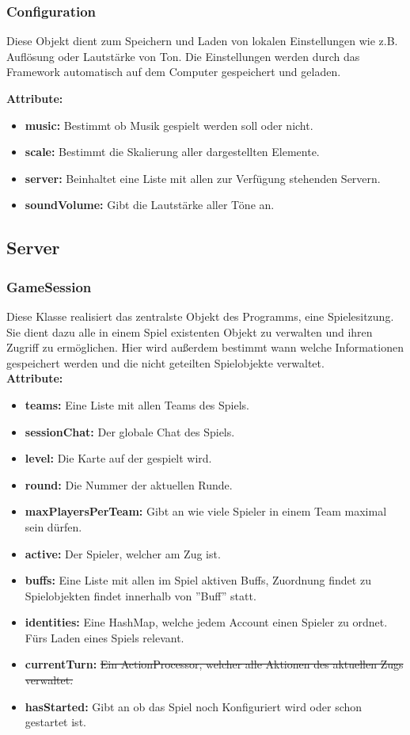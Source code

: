 \documentclass[fontsize=12pt,paper=a4,twoside]{scrartcl}
\begin{document}
\subsubsection{Configuration}
Diese Objekt dient zum Speichern und Laden von lokalen Einstellungen wie z.B. Auflösung oder Lautstärke von Ton. Die Einstellungen werden durch das Framework automatisch auf dem Computer gespeichert und geladen.

\textbf{Attribute:}
\begin{itemize}
	\item \textbf{music:} Bestimmt ob Musik gespielt werden soll oder nicht.
	\item \textbf{scale:} Bestimmt die Skalierung aller dargestellten Elemente.
	\item \textbf{server:} Beinhaltet eine Liste mit allen zur Verfügung stehenden Servern.
	\item \textbf{soundVolume:} Gibt die Lautstärke aller Töne an. 
\end{itemize}

\subsection{Server}

\subsubsection{GameSession}

Diese Klasse realisiert das zentralste Objekt des Programms, eine Spielesitzung. Sie dient dazu alle in einem Spiel existenten Objekt zu verwalten und ihren Zugriff zu ermöglichen. Hier wird außerdem bestimmt wann welche Informationen gespeichert werden und die nicht geteilten Spielobjekte verwaltet. \\

\textbf{Attribute:}
\begin{itemize}
\item \textbf{teams:} Eine Liste mit allen Teams des Spiels.
\item \textbf{sessionChat:} Der globale Chat des Spiels.
\item \textbf{level:} Die Karte auf der gespielt wird.
\item \textbf{round:} Die Nummer der aktuellen Runde.
\item \textbf{maxPlayersPerTeam:} Gibt an wie viele Spieler in einem Team maximal sein dürfen.
\item \textbf{active:} Der Spieler, welcher am Zug ist.
\item \textbf{buffs:} Eine Liste mit allen im Spiel aktiven Buffs, Zuordnung findet zu Spielobjekten findet innerhalb von ''Buff'' statt.
\item \textbf{identities:} Eine HashMap, welche jedem Account einen Spieler zu ordnet. Fürs Laden eines Spiels relevant.
\item \textbf{currentTurn:}\sout{ Ein ActionProcessor, welcher alle Aktionen des aktuellen Zugs verwaltet.}
\item \textbf{hasStarted:} Gibt an ob das Spiel noch Konfiguriert wird oder schon gestartet ist.
\end{itemize}
\end{document}
